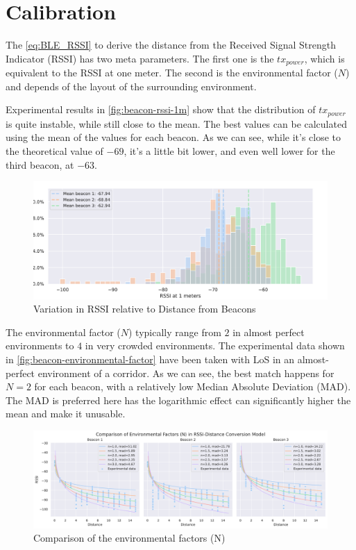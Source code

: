 \section{Calibration}

The \autoref{eq:BLE_RSSI} to derive the distance from the Received Signal Strength Indicator (RSSI) has two meta parameters. The first one is the $tx_{power}$, which is equivalent to the RSSI at one meter. The second is the environmental factor ($N$) and depends of the layout of the surrounding environment. 


Experimental results in \autoref{fig:beacon-rssi-1m} show that the distribution of $tx_{power}$ is quite instable, while still close to the mean. The best values can be calculated using the mean of the values for each beacon. As we  can see, while it's close to the theoretical value of $-69$, it's a little bit lower, and even well lower for the third beacon, at $-63$.

\begin{figure}[h]
    \centering
    \includegraphics[width=\linewidth]{assets/beacon-rssi-1m.pdf}
    \caption{Variation in RSSI relative to Distance from Beacons}
    \label{fig:beacon-rssi-1m}
\end{figure}

The environmental factor ($N$) typically range from $2$ in almost perfect environments to $4$ in very crowded environments. The experimental data shown in \autoref{fig:beacon-environmental-factor} have been taken with LoS in an almost-perfect environment of a corridor. As we can see, the best match happens for $N=2$ for each beacon, with a relatively low Median Absolute Deviation (MAD). The MAD is preferred here has the logarithmic effect can significantly higher the mean and make it unusable.

\begin{figure}[h]
    \centering
    \includegraphics[width=\linewidth]{assets/beacon-environmental-factor.pdf}
    \caption{Comparison of the environmental factors (N)}
    \label{fig:beacon-environmental-factor}
\end{figure}

